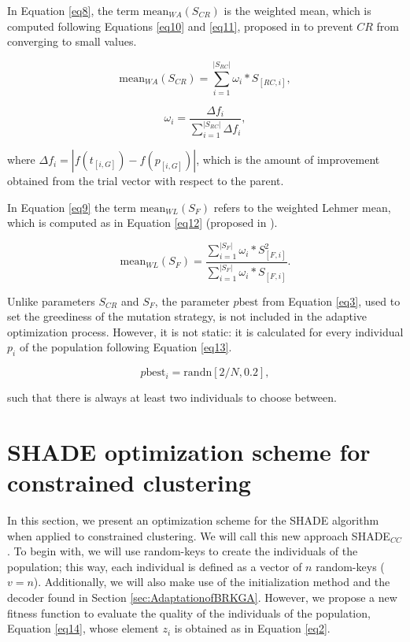 \documentclass[review]{elsarticle}
\begin{document}
In Equation \ref{eq8}, the term $\text{mean}_{WA} (S_{CR})$ is the weighted mean, which is computed following Equations \eqref{eq10} and \eqref{eq11}, proposed in \cite{peng2009multi} to prevent $CR$ from converging to small values.

\begin{equation}
\text{mean}_{WA} (S_{CR}) = \sum_{i = 1}^{|S_{RC}|} \omega_i * S_{[RC,i]},
\label{eq10}
\end{equation}

\begin{equation}
\omega_i = \frac{\Delta f_i}{\sum_{i = 1}^{|S_{RC}|} \Delta f_i},
\label{eq11}
\end{equation}

\noindent where $\Delta f_i = |f(t_{[i,G]}) - f(p_{[i, G]})|$, which is the amount of improvement obtained from the trial vector with respect to the parent.

In Equation \ref{eq9} the term $\text{mean}_{WL} (S_{F})$ refers to the weighted Lehmer mean, which is computed as in Equation \eqref{eq12} (proposed in \cite{tanabe2013success}).

\begin{equation}
\text{mean}_{WL} (S_{F}) = \frac{\sum_{i = 1}^{|S_{F}|} \omega_i * S^2_{[F,i]}}{\sum_{i = 1}^{|S_{F}|} \omega_i * S_{[F,i]}}.
\label{eq12}
\end{equation}

Unlike parameters $S_{CR}$ and $S_F$, the parameter $p\text{best}$ from Equation \eqref{eq3}, used to set the greediness of the mutation strategy, is not included in the adaptive optimization process. However, it is not static: it is calculated for every individual $p_i$ of the population following Equation \eqref{eq13}.

\begin{equation}
p\text{best}_i = \text{randn}[2/N, 0.2],
\label{eq13}
\end{equation}

\noindent such that there is always at least two individuals to choose between.

\section{SHADE optimization scheme for constrained clustering} \label{sec:SHADEadapt}

In this section, we present an optimization scheme for the SHADE algorithm when applied to constrained clustering. We will call this new approach SHADE$_{CC}$. To begin with, we will use random-keys to create the individuals of the population; this way, each individual is defined as a vector of $n$ random-keys ($v = n$). Additionally, we will also make use of the initialization method and the decoder found in Section \ref{sec:AdaptationofBRKGA}. However, we propose a new fitness function to evaluate the quality of the individuals of the population, Equation \eqref{eq14}, whose element $z_i$ is obtained as in Equation \eqref{eq2}.
\end{document}
